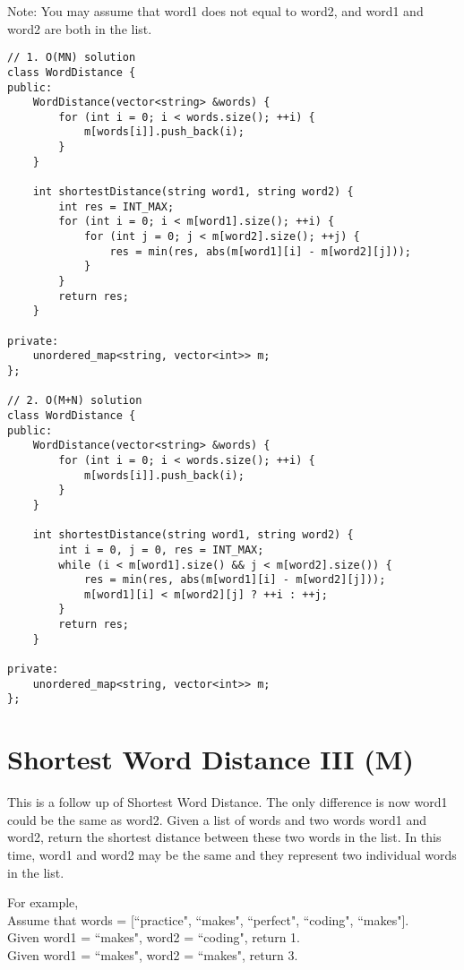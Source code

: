 Note: You may assume that word1 does not equal to word2, and word1 and word2 are both in the list.\\

\begin{lstlisting}
// 1. O(MN) solution
class WordDistance {
public:
    WordDistance(vector<string> &words) {
        for (int i = 0; i < words.size(); ++i) {
            m[words[i]].push_back(i);
        }
    }
    
    int shortestDistance(string word1, string word2) {
        int res = INT_MAX;
        for (int i = 0; i < m[word1].size(); ++i) {
            for (int j = 0; j < m[word2].size(); ++j) {
                res = min(res, abs(m[word1][i] - m[word2][j]));
            }
        }
        return res;
    }

private:
    unordered_map<string, vector<int>> m;
};

// 2. O(M+N) solution
class WordDistance {
public:
    WordDistance(vector<string> &words) {
        for (int i = 0; i < words.size(); ++i) {
            m[words[i]].push_back(i);
        }
    }
    
    int shortestDistance(string word1, string word2) {
        int i = 0, j = 0, res = INT_MAX;
        while (i < m[word1].size() && j < m[word2].size()) {
            res = min(res, abs(m[word1][i] - m[word2][j]));
            m[word1][i] < m[word2][j] ? ++i : ++j;    
        }
        return res;
    }

private:
    unordered_map<string, vector<int>> m;
};
\end{lstlisting}


\section{Shortest Word Distance III (M)}
This is a follow up of Shortest Word Distance. The only difference is now word1 could be the same as word2. Given a list of words and two words word1 and word2, return the shortest distance between these two words in the list. In this time, word1 and word2 may be the same and they represent two individual words in the list.

For example,\\
Assume that words = [``practice", ``makes", ``perfect", ``coding", ``makes"].\\
Given word1 = ``makes", word2 = ``coding", return 1.\\
Given word1 = ``makes", word2 = ``makes", return 3.\\

